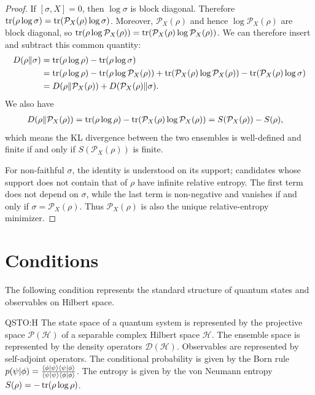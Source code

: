 \documentclass{techbrief}
\begin{document}
\begin{proof}
	If $[\sigma,X]=0$, then $\log\sigma$ is block diagonal. Therefore $\operatorname{tr}(\rho\log\sigma)=\operatorname{tr}(\mathcal{P}_X(\rho)\log\sigma)$. Moreover, $\mathcal{P}_X(\rho)$ and hence $\log\mathcal{P}_X(\rho)$ are block diagonal, so $\operatorname{tr}(\rho\log\mathcal{P}_X(\rho))=\operatorname{tr}(\mathcal{P}_X(\rho)\log\mathcal{P}_X(\rho))$. We can therefore insert and subtract this common quantity:
	\begin{equation}
	\begin{aligned}
	D(\rho\Vert\sigma)
	&=\operatorname{tr}(\rho\log\rho)-\operatorname{tr}(\rho\log\sigma) \\
	&=\operatorname{tr}(\rho\log\rho)-\operatorname{tr}(\rho\log\mathcal{P}_X(\rho))+\operatorname{tr}(\mathcal{P}_X(\rho)\log\mathcal{P}_X(\rho))-\operatorname{tr}(\mathcal{P}_X(\rho)\log\sigma)\\
	&=D(\rho\Vert\mathcal{P}_X(\rho))+D(\mathcal{P}_X(\rho)\Vert\sigma).
	\end{aligned}
	\end{equation}
	We also have
	\begin{equation}
	\begin{aligned}
		D(\rho\Vert\mathcal{P}_X(\rho))
		&=\operatorname{tr}(\rho\log\rho)-\operatorname{tr}(\mathcal{P}_X(\rho)\log\mathcal{P}_X(\rho))= S(\mathcal{P}_X(\rho)) - S(\rho),
	\end{aligned}
	\end{equation}
	which means the KL divergence between the two ensembles is well-defined and finite if and only if $S(\mathcal{P}_X(\rho))$ is finite.
	
	For non-faithful $\sigma$, the identity is understood on its support; candidates whose support does not contain that of $\rho$ have infinite relative entropy. The first term does not depend on $\sigma$, while the last term is non-negative and vanishes if and only if $\sigma=\mathcal{P}_X(\rho)$. Thus $\mathcal{P}_X(\rho)$ is also the unique relative-entropy minimizer.
\end{proof}

\section{Conditions}

The following condition represents the standard structure of quantum states and observables on Hilbert space.
\begin{condition}{QSTO:H}
	The state space of a quantum system is represented by the projective space $\mathcal{P}(\mathcal{H})$ of a separable complex Hilbert space $\mathcal{H}$. The ensemble space is represented by the density operators $\mathcal{D}(\mathcal{H})$. Observables are represented by self-adjoint operators. The conditional probability is given by the Born rule $p(\psi|\phi) = \frac{\langle \phi | \psi \rangle\langle \psi | \phi \rangle}{\langle \psi | \psi \rangle\langle \phi | \phi \rangle}$. The entropy is given by the von Neumann entropy $S(\rho) = -\operatorname{tr}(\rho \log \rho)$.
\end{condition}
\end{document}
